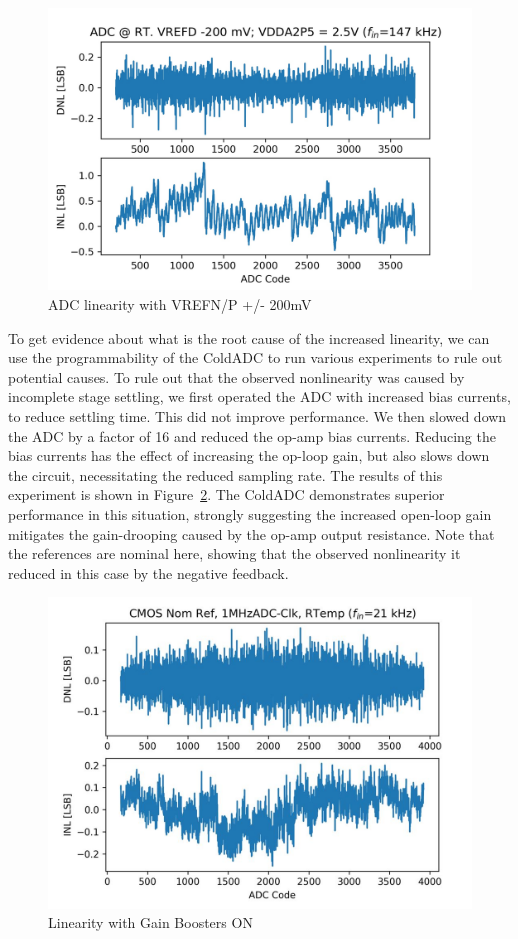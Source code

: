 \begin{figure}[h!]
\centering
  \includegraphics[width=0.7\linewidth]{figures/prakash_fig/linearity_200mv.JPG}
  \caption{ADC linearity with VREFN/P +/- 200mV}
  \label{fig:linearity_200mv}
\end{figure}


To get evidence about what is the root cause of the increased linearity, we can use the programmability of the ColdADC to run various experiments to rule out potential causes. To rule out that the observed nonlinearity was caused by incomplete stage settling, we first operated the ADC with increased bias currents, to reduce settling time. This did not improve performance. We then slowed down the ADC by a factor of 16 and reduced the op-amp bias currents. Reducing the bias currents has the effect of increasing the op-loop gain, but also slows down the circuit, necessitating the reduced sampling rate. 
The results of this experiment is shown in Figure~\ref{fig:linearity_GB_ON}. The ColdADC demonstrates superior performance in this situation, strongly suggesting the increased open-loop gain mitigates the gain-drooping caused by the op-amp output resistance. Note that the references are nominal here, showing that the observed nonlinearity it reduced in this case by the negative feedback.

\begin{figure}[h!]
\centering
  \includegraphics[width=0.7\linewidth]{figures/prakash_fig/linearity_GB_ON.JPG}
  \caption{Linearity with Gain Boosters ON}
  \label{fig:linearity_GB_ON}
\end{figure}

